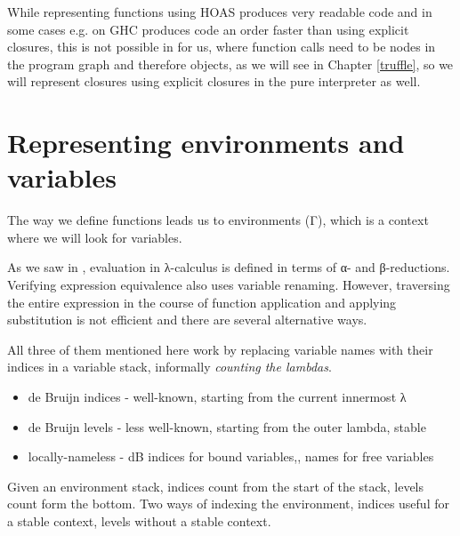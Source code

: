 \documentclass[english,zadani,odsaz]{fitthesis}
\begin{document}
While representing functions using HOAS produces very readable code and in some
cases e.g. on GHC produces code an order faster than using explicit closures,
this is not possible in for us, where function calls need to be nodes in the
program graph and therefore objects, as we will see in Chapter \ref{truffle}, so
we will represent closures using explicit closures in the pure interpreter as well.





\section{Representing environments and variables}
\label{sec:org3a38fad}
The way we define functions leads us to environments (Γ), which is a context
where we will look for variables.


As we saw in , evaluation in λ-calculus is defined
in terms of α- and β-reductions. Verifying expression equivalence also uses
variable renaming. However, traversing the entire expression in the course of
function application and applying substitution is not efficient and there are
several alternative ways.


All three of them mentioned here work by replacing variable names with their
indices in a variable stack, informally \emph{counting the lambdas}.

\begin{itemize}
\item de Bruijn indices - well-known, starting from the current innermost λ
\item de Bruijn levels - less well-known, starting from the outer lambda, stable
\item locally-nameless - dB indices for bound variables,, names for free variables
\end{itemize}

Given an environment stack, indices count from the start of the stack, levels
count form the bottom. Two ways of indexing the environment, indices useful for
a stable context, levels without a stable context.
\end{document}
